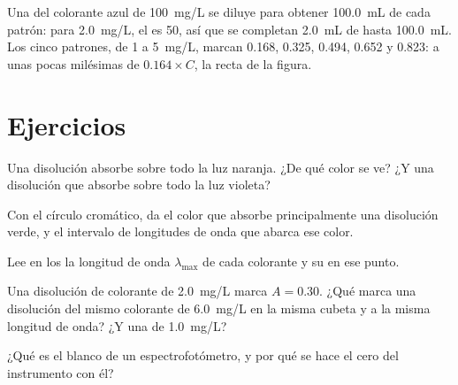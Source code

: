 \begin{example}\label{ex:g11:absorbance:standards}
Una  del colorante azul de \qty{100}{mg/L} se diluye
para obtener \qty{100.0}{mL} de cada patrón: para \qty{2.0}{mg/L}, el
 es 50, así que se completan \qty{2.0}{mL} de
 hasta \qty{100.0}{mL}. Los cinco patrones, de 1 a
\qty{5}{mg/L}, marcan 0.168, 0.325, 0.494, 0.652 y 0.823: a unas pocas
milésimas de $0.164 \times C$, la recta de la figura.
\end{example}

\section{Ejercicios}

\begin{exercise}[$\star$]\label{exo:g11:absorbance:1}
Una disolución absorbe sobre todo la luz naranja. ¿De qué color se ve?
¿Y una disolución que absorbe sobre todo la luz violeta?
\end{exercise}

\begin{exercise}[$\star$]\label{exo:g11:absorbance:2}
Con el círculo cromático, da el color que absorbe principalmente una
disolución verde, y el intervalo de longitudes de onda que abarca ese
color.
\end{exercise}

\begin{exercise}[$\star$]\label{exo:g11:absorbance:3}
Lee en los  la longitud de onda $\lambda_{\max}$ de
cada colorante y su  en ese punto.
\end{exercise}

\begin{exercise}[$\star$]\label{exo:g11:absorbance:4}
Una disolución de colorante de \qty{2.0}{mg/L} marca $A = 0.30$. ¿Qué
marca una disolución del mismo colorante de \qty{6.0}{mg/L} en la misma
cubeta y a la misma longitud de onda? ¿Y una de \qty{1.0}{mg/L}?
\end{exercise}

\begin{exercise}[$\star$]\label{exo:g11:absorbance:5}
¿Qué es el blanco de un espectrofotómetro, y por qué se hace el cero
del instrumento con él?
\end{exercise}

